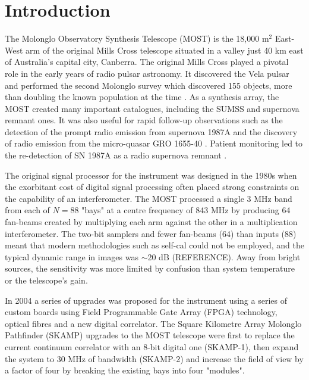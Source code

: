 \section{Introduction} 
The Molonglo Observatory Synthesis Telescope (MOST) is the 18,000 m$^2$ East-West arm of the original Mills Cross telescope situated in a valley just 40 km east of Australia's capital city, Canberra. The original Mills Cross played a pivotal role in the early years of radio pulsar astronomy. It discovered the Vela pulsar \citep{LARGE_1968} and performed the second Molonglo survey which discovered 155 objects, more than doubling the known population at the time \citep{Manchester_1978}. As a synthesis array, the MOST created many important catalogues, including the SUMSS \citep{Bock_1999,Mauch_2003} and supernova remnant \citep{Whiteoak_1996} ones. It was also useful for rapid follow-up observations such as the detection of the prompt radio emission from supernova 1987A \citep{Turtle_1987} and the discovery of radio emission from the micro-quasar GRO 1655-40 \citep{Tingay_1995}. Patient monitoring led to the re-detection of SN 1987A as a radio supernova remnant \citep{Staveley_Smith_1992}.

The original signal processor \citep{Robertson_1991} for the instrument was designed in the 1980s when the exorbitant cost of digital signal processing often placed strong constraints on the capability of an interferometer. The MOST processed a single 3 MHz band from each of $N=88$ "bays" at a centre frequency of 843 MHz by producing 64 fan-beams created by multiplying each arm against the other in a multiplication interferometer. The two-bit samplers and fewer fan-beams (64) than inputs (88) meant that modern methodologies such as self-cal could not be employed, and the typical dynamic range in images was $\sim$20 dB (REFERENCE). Away from bright sources, the sensitivity was more limited by confusion than system temperature or the telescope's gain.

In 2004 a series of upgrades was proposed for the instrument using a series of custom boards using Field Programmable Gate Array (FPGA) technology, optical fibres and a new digital correlator\citep{Adams_2004}. The Square Kilometre Array Molonglo Pathfinder (SKAMP) upgrades to the MOST telescope were first to replace the current continuum correlator with an 8-bit digital one (SKAMP-1), then expand the system to 30 MHz of bandwidth (SKAMP-2) and increase the field of view by a factor of four by breaking the existing bays into four "modules".

